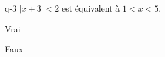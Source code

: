 \begin{truefalse}{q-3}
$|x+3|<2$ est équivalent à $1 < x < 5$.
\item Vrai
\item * Faux
\end{truefalse}

